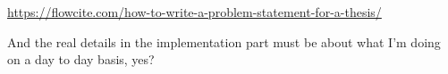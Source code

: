 \url{https://flowcite.com/how-to-write-a-problem-statement-for-a-thesis/}

And the real details in the implementation part must be about what I'm doing on a day to day basis, yes?

